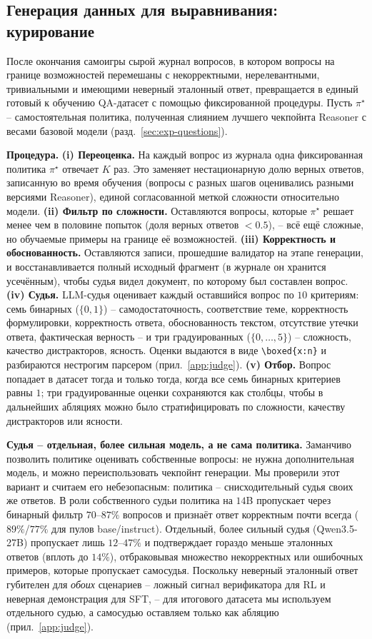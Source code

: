 \documentclass{article}
\begin{document}
\subsection{Генерация данных для выравнивания: курирование}\label{sec:method-curation}

После окончания самоигры сырой журнал вопросов, в котором вопросы на границе возможностей перемешаны с некорректными, нерелевантными, тривиальными и имеющими неверный эталонный ответ, превращается в единый готовый к обучению QA-датасет с помощью фиксированной процедуры. Пусть $\pi^\star$ -- самостоятельная политика, полученная слиянием лучшего чекпойнта Reasoner с весами базовой модели (разд.~\ref{sec:exp-questions}).

\textbf{Процедура.}
\textbf{(i) Переоценка.} На каждый вопрос из журнала одна фиксированная политика $\pi^\star$ отвечает $K$ раз. Это заменяет нестационарную долю верных ответов, записанную во время обучения (вопросы с разных шагов оценивались разными версиями Reasoner), единой согласованной меткой сложности относительно модели.
\textbf{(ii) Фильтр по сложности.} Оставляются вопросы, которые $\pi^\star$ решает менее чем в половине попыток (доля верных ответов $<0.5$), -- всё ещё сложные, но обучаемые примеры на границе её возможностей.
\textbf{(iii) Корректность и обоснованность.} Оставляются записи, прошедшие валидатор на этапе генерации, и восстанавливается полный исходный фрагмент (в журнале он хранится усечённым), чтобы судья видел документ, по которому был составлен вопрос.
\textbf{(iv) Судья.} LLM-судья оценивает каждый оставшийся вопрос по $10$ критериям: семь бинарных ($\{0,1\}$) -- самодостаточность, соответствие теме, корректность формулировки, корректность ответа, обоснованность текстом, отсутствие утечки ответа, фактическая верность -- и три градуированных ($\{0,\dots,5\}$) -- сложность, качество дистракторов, ясность. Оценки выдаются в виде \verb|\boxed{x:n}| и разбираются нестрогим парсером (прил.~\ref{app:judge}).
\textbf{(v) Отбор.} Вопрос попадает в датасет тогда и только тогда, когда все семь бинарных критериев равны $1$; три градуированные оценки сохраняются как столбцы, чтобы в дальнейших абляциях можно было стратифицировать по сложности, качеству дистракторов или ясности.

\textbf{Судья -- отдельная, более сильная модель, а не сама политика.}
Заманчиво позволить политике оценивать собственные вопросы: не нужна дополнительная модель, и можно переиспользовать чекпойнт генерации. Мы проверили этот вариант и считаем его небезопасным: политика -- снисходительный судья своих же ответов. В роли собственного судьи политика на $14$B пропускает через бинарный фильтр $70$--$87\%$ вопросов и признаёт ответ корректным почти всегда ($89\%$/$77\%$ для пулов base/instruct). Отдельный, более сильный судья (Qwen3.5-27B) пропускает лишь $12$--$47\%$ и подтверждает гораздо меньше эталонных ответов (вплоть до $14\%$), отбраковывая множество некорректных или ошибочных примеров, которые пропускает самосудья. Поскольку неверный эталонный ответ губителен для \emph{обоих} сценариев -- ложный сигнал верификатора для RL и неверная демонстрация для SFT, -- для итогового датасета мы используем отдельного судью, а самосудью оставляем только как абляцию (прил.~\ref{app:judge}).
\end{document}
